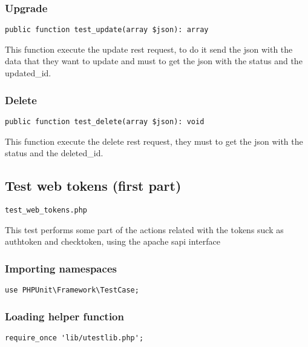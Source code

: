 \documentclass[a4paper]{article}
\begin{document}
\hypertarget{toc414}{}
\subsubsection{Upgrade}

\begin{lstlisting}
public function test_update(array $json): array
\end{lstlisting}

This function execute the update rest request, to do it send the json with
the data that they want to update and must to get the json with the status
and the updated\_id.

\hypertarget{toc415}{}
\subsubsection{Delete}

\begin{lstlisting}
public function test_delete(array $json): void
\end{lstlisting}

This function execute the delete rest request, they must to get the json
with the status and the deleted\_id.

\hypertarget{toc416}{}
\subsection{Test web tokens (first part)}

\begin{lstlisting}
test_web_tokens.php
\end{lstlisting}

This test performs some part of the actions related with the tokens suck
as authtoken and checktoken, using the apache sapi interface

\hypertarget{toc417}{}
\subsubsection{Importing namespaces}

\begin{lstlisting}
use PHPUnit\Framework\TestCase;
\end{lstlisting}

\hypertarget{toc418}{}
\subsubsection{Loading helper function}

\begin{lstlisting}
require_once 'lib/utestlib.php';
\end{lstlisting}
\end{document}
